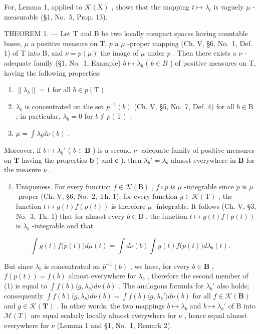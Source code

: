 For, Lemma 1, applied to \(\mathcal{K}(\mathrm{X})\) , shows that the mapping \(t \mapsto \lambda_t\) is vaguely \(\mu\) -measurable (§1, No.~5, Prop. 13).

THEOREM 1. --- Let T and B be two locally compact spaces having countable bases, \(\mu\) a positive measure on T, \(p\) a \(\mu\) -proper mapping (Ch. V, §6, No.~1, Def. 1) of T into B, and \(\nu = p(\mu)\) the image of \(\mu\) under \(p\) . Then there exists a \(\nu\) -adequate family (§1, No.~1, Example) \(b \mapsto \lambda_b\) ( \(b \in B\) ) of positive measures on T, having the following properties:

\begin{enumerate}
\def\labelenumi{\alph{enumi})}
\item
  \(\| \lambda_b\| = 1\) for all \(b\in p(\mathrm{T})\)
\item
  \(\lambda_{b}\) is concentrated on the set \(\overline{p}^{-1}(b)\) (Ch. V, §5, No.~7, Def. 4) for all \(b\in \mathrm{B}\) ; in particular, \(\lambda_{b} = 0\) for \(b\notin p(\mathrm{T})\) ;
\item
  \(\mu = \int \lambda_b d\nu(b)\) .
\end{enumerate}

Moreover, if \(b \mapsto \lambda_b'\) ( \(b \in \mathbf{B}\) ) is a second \(\nu\) -adequate family of positive measures on \(\mathbf{T}\) having the properties \(\mathbf{b}\) ) and \(\mathbf{c}\) ), then \(\lambda_b' = \lambda_b\) almost everywhere in \(\mathbf{B}\) for the measure \(\nu\) .

\begin{enumerate}
\def\labelenumi{\arabic{enumi})}
\tightlist
\item
  Uniqueness. For every function \(f \in \mathcal{K}(\mathrm{B})\) , \(f \circ p\) is \(\mu\) -integrable since \(p\) is \(\mu\) -proper (Ch. V, §6, No.~2, Th. 1); for every function \(g \in \mathcal{K}(\mathrm{T})\) , the function \(t \mapsto g(t)f(p(t))\) is therefore \(\mu\) -integrable. It follows (Ch. V, §3, No.~3, Th. 1) that for almost every \(b \in \mathrm{B}\) , the function \(t \mapsto g(t)f(p(t))\) is \(\lambda_b\) -integrable and that
\end{enumerate}

\[
\int g (t) f \bigl (p (t) \bigr) d \mu (t) = \int d \nu (b) \int g (t) f \bigl (p (t) \bigr) d \lambda_ {b} (t).\tag{1}
\]

But since \(\lambda_{b}\) is concentrated on \(\overline{p}^{-1}(b)\) , we have, for every \(b \in \mathbf{B}\) , \(f(p(t)) = f(b)\) almost everywhere for \(\lambda_{b}\) , therefore the second member of (1) is equal to \(\int f(b)\langle g, \lambda_{b} \rangle d\nu(b)\) . The analogous formula for \(\lambda_{b}'\) also holds; consequently \(\int f(b)\langle g, \lambda_{b} \rangle d\nu(b) = \int f(b)\langle g, \lambda_{b}' \rangle d\nu(b)\) for all \(f \in \mathcal{K}(\mathbf{B})\) and \(g \in \mathcal{K}(\mathbf{T})\) . In other words, the two mappings \(b \mapsto \lambda_{b}\) and \(b \mapsto \lambda_{b}'\) of B into \(\mathcal{M}(T)\) are equal scalarly locally almost everywhere for \(\nu\) , hence equal almost everywhere for \(\nu\) (Lemma 1 and §1, No.~1, Remark 2).

